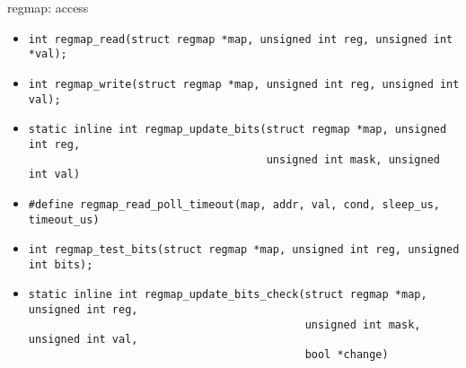 \begin{frame}[fragile]{regmap: access}
  \begin{itemize}
    \fontsize{9}{9}\selectfont
    \item 
      \begin{block}{}
        \begin{verbatim}
int regmap_read(struct regmap *map, unsigned int reg, unsigned int *val);
        \end{verbatim}
      \end{block}
    \item 
      \begin{block}{}
        \begin{verbatim}
int regmap_write(struct regmap *map, unsigned int reg, unsigned int val);
        \end{verbatim}
      \end{block}
    \item 
      \begin{block}{}
        \begin{verbatim}
static inline int regmap_update_bits(struct regmap *map, unsigned int reg,
                                     unsigned int mask, unsigned int val)
        \end{verbatim}
      \end{block}
    \item 
      \begin{block}{}
        \begin{verbatim}
#define regmap_read_poll_timeout(map, addr, val, cond, sleep_us, timeout_us)
        \end{verbatim}
      \end{block}
    \item 
      \begin{block}{}
        \begin{verbatim}
int regmap_test_bits(struct regmap *map, unsigned int reg, unsigned int bits);
        \end{verbatim}
      \end{block}
    \item 
      \begin{block}{}
        \begin{verbatim}
static inline int regmap_update_bits_check(struct regmap *map, unsigned int reg,
                                           unsigned int mask, unsigned int val,
                                           bool *change)
        \end{verbatim}
      \end{block}
  \end{itemize}
\end{frame}

